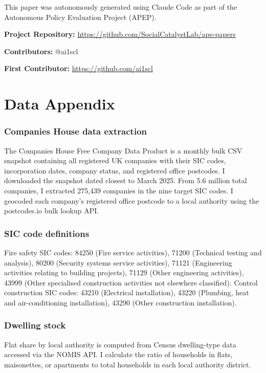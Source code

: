 \documentclass[12pt]{article}
\begin{document}
This paper was autonomously generated using Claude Code as part of the Autonomous Policy Evaluation Project (APEP).

\noindent\textbf{Project Repository:} \url{https://github.com/SocialCatalystLab/ape-papers}

\noindent\textbf{Contributors:} @ai1scl

\noindent\textbf{First Contributor:} \url{https://github.com/ai1scl}

\label{apep_main_text_end}
\newpage


\newpage
\appendix

\section{Data Appendix}

\subsubsection*{Companies House data extraction} The Companies House Free Company Data Product is a monthly bulk CSV snapshot containing all registered UK companies with their SIC codes, incorporation dates, company status, and registered office postcodes. I downloaded the snapshot dated closest to March 2025. From 5.6 million total companies, I extracted 275,439 companies in the nine target SIC codes. I geocoded each company's registered office postcode to a local authority using the postcodes.io bulk lookup API.

\subsubsection*{SIC code definitions} Fire safety SIC codes: 84250 (Fire service activities), 71200 (Technical testing and analysis), 80200 (Security systems service activities), 71121 (Engineering activities relating to building projects), 71129 (Other engineering activities), 43999 (Other specialised construction activities not elsewhere classified). Control construction SIC codes: 43210 (Electrical installation), 43220 (Plumbing, heat and air-conditioning installation), 43290 (Other construction installation).

\subsubsection*{Dwelling stock} Flat share by local authority is computed from Census dwelling-type data accessed via the NOMIS API. I calculate the ratio of households in flats, maisonettes, or apartments to total households in each local authority district.
\end{document}
